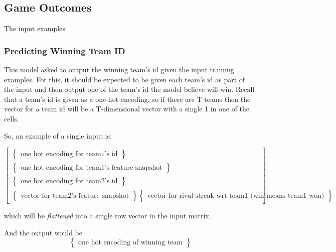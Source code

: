 \documentclass{article} %
\begin{document}
\subsection{Game Outcomes}
\label{sec:architectures-winner}

The input examples 

\subsubsection{Predicting Winning Team ID}
\label{sec:architectures-winner-winning-team-id}

This model asked to output the winning team's id given the input training examples.  For this, it should be expected to be given each team's id as part of the input and then output one of the team's id the model believe will win.  Recall that a team's id is given as a one-hot encoding, so if there are T teams then the vector for a team id will be a T-dimensional vector with a single 1 in one of the cells.

So, an example of a single input is:

\[
\begin{bmatrix}
  \begin{Bmatrix}
    \text{one hot encoding for team1's id}
  \end{Bmatrix}
  \\
  \begin{Bmatrix}
    \text{one hot encoding for team1's feature snapshot}
  \end{Bmatrix}
  \\
  \begin{Bmatrix}
    \text{one hot encoding for team2's id}
  \end{Bmatrix}
  \\
  \begin{Bmatrix}
    \text{vector for team2's feature snapshot}
  \end{Bmatrix}
  \begin{Bmatrix}
    \text{vector for rival streak wrt team1 (win means team1 won)}
  \end{Bmatrix}
\end{bmatrix}
\]

which will be \textit{flattened} into a single row vector in the input matrix.

And the output would be
\[
\begin{Bmatrix}
  \text{one hot encoding of winning team}
\end{Bmatrix}
\]
\end{document}

